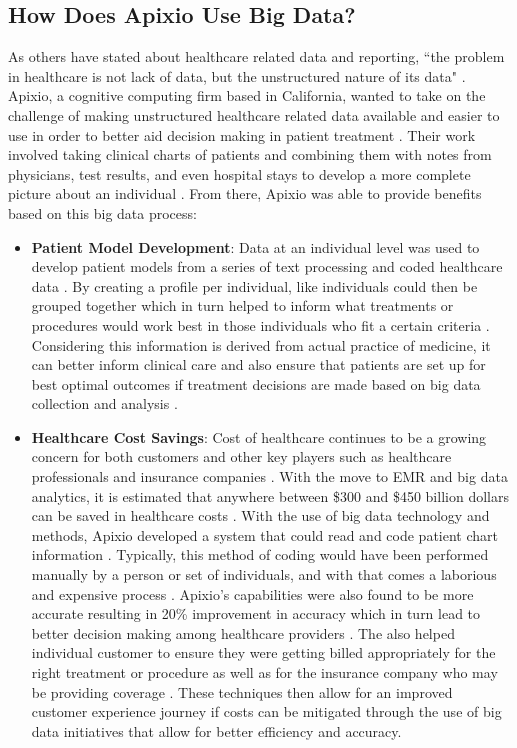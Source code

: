 \documentclass[sigconf]{acmart}
\begin{document}
\subsection{How Does Apixio Use Big Data?}
As others have stated about healthcare related data and reporting, ``the problem in healthcare is not lack of data, but the unstructured nature of its data" \cite{Marr2016b}. Apixio, a cognitive computing firm based in California, wanted to take on the challenge of making unstructured healthcare related data available and easier to use in order to better aid decision making in patient treatment \cite{Marr2016b}. Their work involved taking clinical charts of patients and combining them with notes from physicians, test results, and even hospital stays to develop a more complete picture about an individual \cite{Marr2016b}. From there, Apixio was able to provide benefits based on this big data process:
 \begin{itemize}
 \item \textbf{Patient Model Development}: Data at an individual level was used to develop patient models from a series of text processing and coded healthcare data \cite{Marr2016b}. By creating a profile per individual, like individuals could then be grouped together which in turn helped to inform what treatments or procedures would work best in those individuals who fit a certain criteria \cite{Marr2016b}. Considering this information is derived from actual practice of medicine, it can better inform clinical care and also ensure that patients are set up for best optimal outcomes if treatment decisions are made based on big data collection and analysis \cite{Marr2016b}. 
  \item \textbf{Healthcare Cost Savings}: Cost of healthcare continues to be a growing concern for both customers and other key players such as healthcare professionals and insurance companies \cite{Nambiar2013}. With the move to EMR and big data analytics, it is estimated that anywhere between \$300 and \$450 billion dollars can be saved in healthcare costs \cite{Nambiar2013}. With the use of big data technology and methods, Apixio developed a system that could read and code patient chart information \cite{Marr2016b}. Typically, this method of coding would have been performed manually by a person or set of individuals, and with that comes a laborious and expensive process \cite{Marr2016b}. Apixio's capabilities were also found to be more accurate resulting in 20\% improvement in accuracy which in turn lead to better decision making among healthcare providers \cite{Marr2016b}. The also helped individual customer to ensure they were getting billed appropriately for the right treatment or procedure as well as for the insurance company who may be providing coverage \cite{Marr2016b}. These techniques then allow for an improved customer experience journey if costs can be mitigated through the use of big data initiatives that allow for better efficiency and accuracy. 
  \end{itemize}
\end{document}
